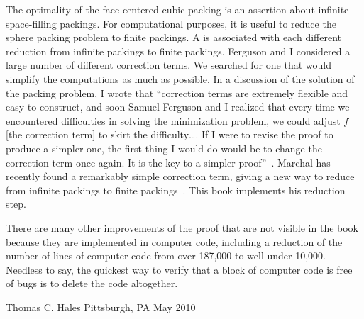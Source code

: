 The optimality of the face-centered cubic packing is an assertion
about infinite space-filling packings.  For computational purposes, it is
useful to reduce the sphere packing problem to finite packings.  A
 is associated with each different reduction from
infinite packings to finite packings.  Ferguson and I considered a
large number of different correction terms.  We searched for one that
would simplify the computations as much as possible.  In a discussion
of the solution of the packing problem, I wrote that ``correction
terms are extremely flexible and easy to construct, and soon Samuel
Ferguson and I realized that every time we encountered difficulties in
solving the minimization problem, we could adjust $f$ [the correction
term] to skirt the difficulty\dots.  If I were to revise the proof
to produce a simpler one, the first thing I would do would be to
change the correction term once again.  It is the key to a simpler
proof''~\cite{Hales:2000:cannonballs}.  Marchal has recently found a remarkably simple 
correction term, giving a new way  to  reduce from infinite packings
to finite packings~\cite{marchal:2009}.  This book implements his reduction step.

There are many other improvements of the proof that are not visible in
the book because they are implemented in computer code, including
a reduction of  the number of lines of computer code from over 187,000
to well under 10,000.  Needless to say, the quickest way to verify that a block
 of computer code is free of bugs is to delete the code altogether.




\bigskip
\hbox{}



\bigskip
\hbox{}

{
\parindent=0pt
\obeylines

Thomas C. Hales
Pittsburgh, PA
May 2010

}







